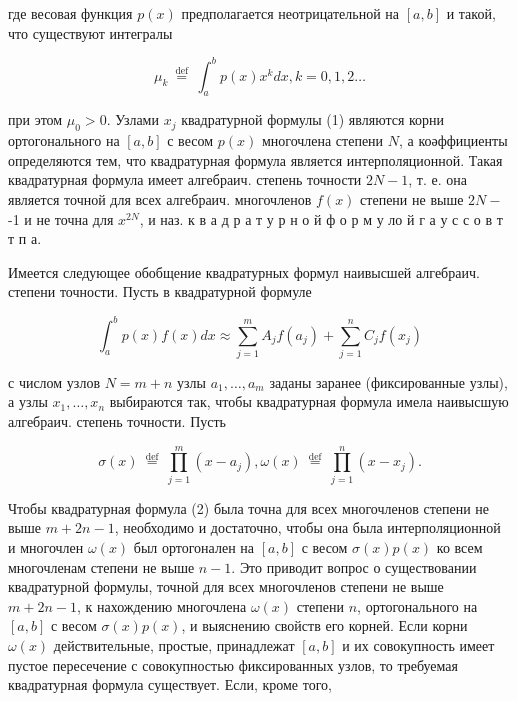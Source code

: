 \documentclass[10pt]{article}
\begin{document}
где весовая функция $p(x)$ предполагается неотрицательной на $[a, b]$ и такой, что существуют интегралы



\[

\mu_{k} \stackrel{\text { def }}{=} \int_{a}^{b} p(x) x^{k} d x, k=0,1,2 \ldots

\]



при этом $\mu_{0}>0$. Узлами $x_{j}$ квадратурной формулы (1) являются корни ортогонального на $[a, b]$ с весом $p(x)$ многочлена степени $N$, а коәффициенты определяются тем, что квадратурная формула является интерполяционной. Такая квадратурная формула имеет алгебраич. степень точности $2 N-1$, т. е. она является точной для всех алгебраич. многочленов $f(x)$ степени не выше $2 N-$ -1 и не точна для $x^{2 N}$, и наз. к в а д р а т у р н о й ф о р м у ло й г а у с с о в т т п а.



Имеется следующее обобщение квадратурных формул наивысшей алгебраич. степени точности. Пусть в квадратурной формуле



\[

\int_{a}^{b} p(x) f(x) d x \approx \sum_{j=1}^{m} A_{j} f\left(a_{j}\right)+\sum_{j=1}^{n} C_{j} f\left(x_{j}\right)

\]



с числом узлов $N=m+n$ узлы $a_{1}, \ldots, a_{m}$ заданы заранее (фиксированные узлы), а узлы $x_{1}, \ldots, x_{n}$ выбираются так, чтобы квадратурная формула имела наивысшую алгебраич. степень точности. Пусть



\[

\sigma(x) \stackrel{\text { def }}{=} \prod_{j=1}^{m}\left(x-a_{j}\right), \omega(x) \stackrel{\text { def }}{=} \prod_{j=1}^{n}\left(x-x_{j}\right) .

\]



Чтобы квадратурная формула (2) была точна для всех многочленов степени не выше $m+2 n-1$, необходимо и достаточно, чтобы она была интерполяционной и многочлен $\omega(x)$ был ортогонален на $[a, b]$ с весом $\sigma(x) p(x)$ ко всем многочленам степени не выше $n-1$. Это приводит вопрос о существовании квадратурной формулы, точной для всех многочленов степени не выше $m+2 n-1$, к нахождению многочлена $\omega(x)$ степени $n$, ортогонального на $[a, b]$ с весом $\sigma(x) p(x)$, и выяснению свойств его корней. Если корни $\omega(x)$ действительные, простые, принадлежат $[a, b]$ и их совокупность имеет пустое пересечение с совокупностью фиксированных узлов, то требуемая квадратурная формула существует. Если, кроме того,
\end{document}
